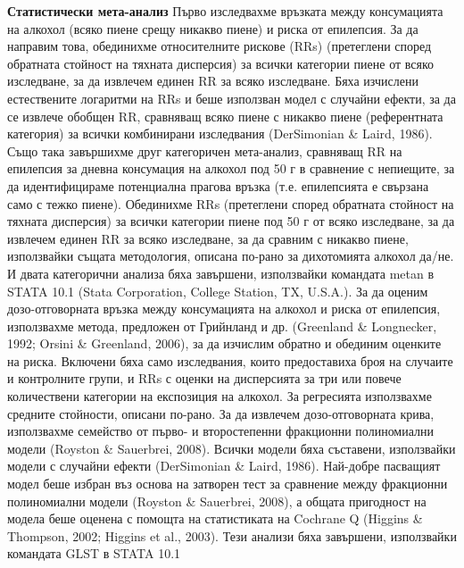 \documentclass{article}
\begin{document}
\textbf{Статистически мета-анализ}
Първо изследвахме връзката между консумацията на алкохол (всяко пиене срещу никакво пиене) и риска от епилепсия. За да направим това, обединихме относителните рискове (RRs) (претеглени според обратната стойност на тяхната дисперсия) за всички категории пиене от всяко изследване, за да извлечем единен RR за всяко изследване. Бяха изчислени естествените логаритми на RRs и беше използван модел с случайни ефекти, за да се извлече обобщен RR, сравняващ всяко пиене с никакво пиене (референтната категория) за всички комбинирани изследвания (DerSimonian \& Laird, 1986).
Също така завършихме друг категоричен мета-анализ, сравняващ RR на епилепсия за дневна консумация на алкохол под 50 г в сравнение с непиещите, за да идентифицираме потенциална прагова връзка (т.е. епилепсията е свързана само с тежко пиене). Обединихме RRs (претеглени според обратната стойност на тяхната дисперсия) за всички категории пиене под 50 г от всяко изследване, за да извлечем единен RR за всяко изследване, за да сравним с никакво пиене, използвайки същата методология, описана по-рано за дихотомията алкохол да/не. И двата категорични анализа бяха завършени, използвайки командата metan в STATA 10.1 (Stata Corporation, College Station, TX, U.S.A.).
За да оценим дозо-отговорната връзка между консумацията на алкохол и риска от епилепсия, използвахме метода, предложен от Грийнланд и др. (Greenland \& Longnecker, 1992; Orsini \& Greenland, 2006), за да изчислим обратно и обединим оценките на риска. Включени бяха само изследвания, които предоставиха броя на случаите и контролните групи, и RRs с оценки на дисперсията за три или повече количествени категории на експозиция на алкохол. За регресията използвахме средните стойности, описани по-рано. За да извлечем дозо-отговорната крива, използвахме семейство от първо- и второстепенни фракционни полиномиални модели (Royston \& Sauerbrei, 2008). Всички модели бяха съставени, използвайки модели с случайни ефекти (DerSimonian \& Laird, 1986). Най-добре пасващият модел беше избран въз основа на затворен тест за сравнение между фракционни полиномиални модели (Royston \& Sauerbrei, 2008), а общата пригодност на модела беше оценена с помощта на статистиката на Cochrane Q (Higgins \& Thompson, 2002; Higgins et al., 2003). Тези анализи бяха завършени, използвайки командата GLST в STATA 10.1

\small
\end{document}
